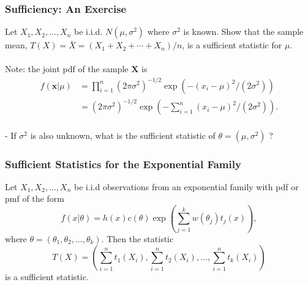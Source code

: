 \documentclass{beamer}
\begin{document}
\begin{frame}
\frametitle{Sufficiency: An Exercise}
Let $X_1,X_2,\ldots,X_n$ be i.i.d. $N(\mu,\sigma^2)$ where $\sigma^2$ is known. Show that the sample mean, $T(X) = \bar{X} = (X_1+X_2+\cdots+X_n)/n$, is a sufficient statistic for $\mu$.
\\~\\
Note: the joint pdf of the sample $\mathbf{X}$ is
$$
\begin{aligned}
f(\mathbf{x}|\mu) &= \prod_{i=1}^n (2\pi \sigma^2)^{-1/2} \exp(-(x_i - \mu)^2/(2\sigma^2))\\
&=(2\pi \sigma^2)^{-1/2} \exp(-\sum_{i=1}^n(x_i - \mu)^2/(2\sigma^2)).
\end{aligned}
$$
~\\
- If $\sigma^2$ is also unknown, what is the sufficient statistic of $\theta=(\mu,\sigma^2)$ ?\\
\end{frame}


\begin{frame}
\frametitle{Sufficient Statistics for the Exponential Family}
Let $X_1,X_2,\ldots,X_n$ be i.i.d observations from an exponential family with pdf or pmf of the form
$$
f(x|\theta) = h(x)c(\theta)\exp\left(\sum_{j=1}^k w(\theta_j)t_j(x)\right),
$$
where $\theta = (\theta_1,\theta_2,\ldots,\theta_k)$. Then the statistic
$$
T(X) = \left(\sum_{i=1}^n t_1(X_i),\sum_{i=1}^n t_2(X_i),\ldots,\sum_{i=1}^n t_k(X_i)\right)
$$
is a sufficient statistic.
\end{frame}
\end{document}
